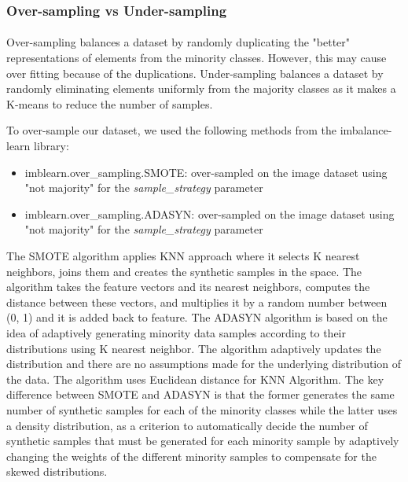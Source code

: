 \documentclass{article}
\begin{document}
\subsubsection{Over-sampling vs Under-sampling}
\paragraph{}
Over-sampling balances a dataset by randomly duplicating the "better" representations of elements from the minority classes. However, this may cause over fitting because of the duplications. Under-sampling balances a dataset by randomly eliminating elements uniformly from the majority classes as it makes a K-means to reduce the number of samples. 

To over-sample our dataset, we used the following methods from the imbalance-learn library:

\begin{itemize}
	\item imblearn.over\_sampling.SMOTE: over-sampled on the image dataset using "not majority" for the \textit{sample\_strategy} parameter
	
	\item imblearn.over\_sampling.ADASYN: over-sampled on the image dataset using "not majority" for the \textit{sample\_strategy} parameter
	
\end{itemize}

The SMOTE algorithm applies KNN approach where it selects K nearest neighbors, joins them and creates the synthetic samples in the space. The algorithm takes the feature vectors and its nearest neighbors, computes the distance between these vectors, and multiplies it by a random number between (0, 1) and it is added back to feature. 
The ADASYN algorithm is based on the idea of adaptively generating minority data samples according to their distributions using K nearest neighbor. The algorithm adaptively updates the distribution and there are no assumptions made for the underlying distribution of the data.  The algorithm uses Euclidean distance for KNN Algorithm. 
The key difference between SMOTE and ADASYN is that the former generates the same number of synthetic samples for each of the minority classes while the latter uses a density distribution, as a criterion to automatically decide the number of synthetic samples that must be generated for each minority sample by adaptively changing the weights of the different minority samples to compensate for the skewed distributions.
\end{document}
